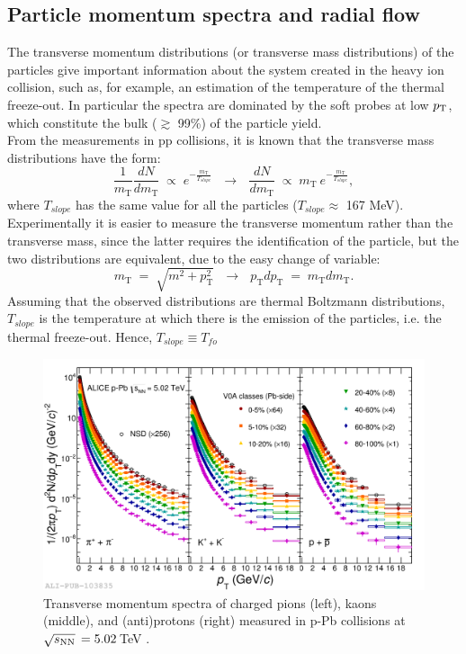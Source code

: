 \subsection{Particle momentum spectra and radial flow}
The transverse momentum distributions (or transverse mass distributions) of the particles give important information about the system created in the heavy ion collision, such as, for example, an estimation of the temperature of the thermal freeze-out. In particular the spectra are dominated by the soft probes at low $p_\text{T}$, which constitute the bulk ($\gtrsim$ 99\%) of the particle yield.\\
From the measurements in pp collisions, it is known that the transverse mass distributions have the form:
\begin{equation}
 \frac{1}{m_{\mathrm{T}}}\frac{dN}{dm_{\mathrm{T}}}\; \propto \; e^{-\frac{m_{\mathrm{T}}}{T_{slope}}} \ \ \ \longrightarrow \ \ \ \frac{dN}{dm_{\mathrm{T}}}\; \propto \;m_{\mathrm{T}}\: e^{-\frac{m_{\mathrm{T}}}{T_{slope}}},
\end{equation}
where $T_{slope}$ has the same value for all the particles ($T_{slope} \approx $ 167 MeV).
Experimentally it is easier to measure the transverse momentum rather than the transverse mass, since the latter requires the identification of the particle, but the two distributions are equivalent, due to the easy change of variable:
\begin{equation}
 m_{\mathrm{T}}\;=\;\sqrt{m^{2}+p_{\mathrm{T}}^2} \ \ \ \longrightarrow \ \ \  p_{\mathrm{T}}dp_{\mathrm{T}}\;=\;m_{\mathrm{T}}dm_{\mathrm{T}}.
\end{equation}
Assuming that the observed distributions are thermal Boltzmann distributions, $T_{slope}$ is the temperature at which there is the emission of the particles, i.e. the thermal freeze-out. Hence, $T_{slope} \equiv T_{fo}$\\
%
\begin{figure}
  \centering
  \includegraphics[scale=0.15]{figures/spectra.png}
  \caption{Transverse momentum spectra of charged pions (left), kaons (middle), and (anti)protons (right) measured in p-Pb collisions at $\sqrt{s_{\rm NN}}\,=5.02$\,TeV \cite{ptspectrum}.}
  \label{fig:breakscale}
\end{figure}
